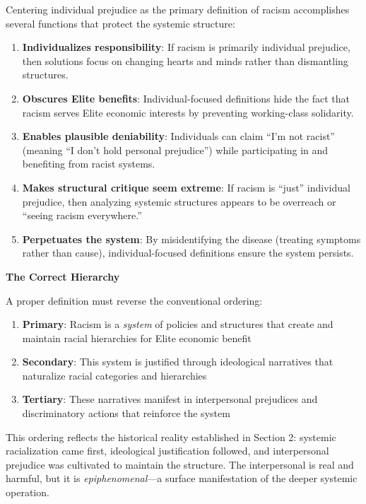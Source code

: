 \documentclass[12pt]{article}
\begin{document}
Centering individual prejudice as the primary definition of racism accomplishes several functions that protect the systemic structure:

\begin{enumerate}
    \item \textbf{Individualizes responsibility}: If racism is primarily individual prejudice, then solutions focus on changing hearts and minds rather than dismantling structures.
    
    \item \textbf{Obscures Elite benefits}: Individual-focused definitions hide the fact that racism serves Elite economic interests by preventing working-class solidarity.
    
    \item \textbf{Enables plausible deniability}: Individuals can claim ``I'm not racist'' (meaning ``I don't hold personal prejudice'') while participating in and benefiting from racist systems.
    
    \item \textbf{Makes structural critique seem extreme}: If racism is ``just'' individual prejudice, then analyzing systemic structures appears to be overreach or ``seeing racism everywhere.''
    
    \item \textbf{Perpetuates the system}: By misidentifying the disease (treating symptoms rather than cause), individual-focused definitions ensure the system persists.
\end{enumerate}

\textbf{The Correct Hierarchy}

A proper definition must reverse the conventional ordering:

\begin{enumerate}
    \item \textbf{Primary}: Racism is a \textit{system} of policies and structures that create and maintain racial hierarchies for Elite economic benefit
    \item \textbf{Secondary}: This system is justified through ideological narratives that naturalize racial categories and hierarchies
    \item \textbf{Tertiary}: These narratives manifest in interpersonal prejudices and discriminatory actions that reinforce the system
\end{enumerate}

This ordering reflects the historical reality established in Section 2: systemic racialization came first, ideological justification followed, and interpersonal prejudice was cultivated to maintain the structure. The interpersonal is real and harmful, but it is \textit{epiphenomenal}---a surface manifestation of the deeper systemic operation.
\end{document}
